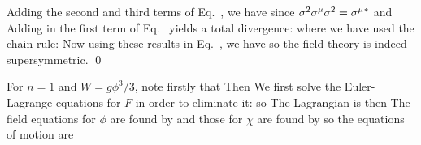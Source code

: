 {	
	Adding the second and third terms of Eq.~, we have
	since $\sigma^2 \sigma^\mu \sigma^2 = \sigma^\mu{}^*$ and
	Adding in the first term of Eq.~ yields a total divergence:
	where we have used the chain rule:
	Now using these results in Eq.~, we have
	so the field theory is indeed supersymmetric. \qed
	
	For $n = 1$ and $W = g \phi^3 / 3$, note firstly that
	Then
	We first solve the Euler-Lagrange equations for $F$ in order to eliminate it:
	so
	The Lagrangian is then
	The field equations for $\phi$ are found by
	and those for $\chi$ are found by
	so the equations of motion are
	\vfix
}